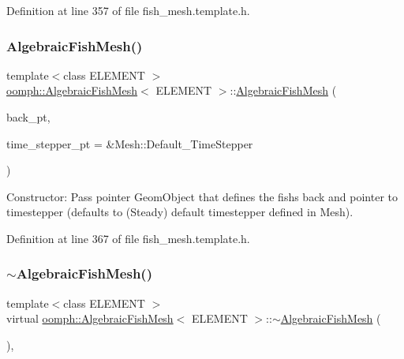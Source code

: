 Definition at line 357 of file fish\+\_\+mesh.\+template.\+h.

\mbox{\label{classoomph_1_1AlgebraicFishMesh_aac4b7f18a6e1d10c64edf431af921ce7}} 
\subsubsection{\texorpdfstring{Algebraic\+Fish\+Mesh()}{AlgebraicFishMesh()}\hspace{0.1cm}{\footnotesize\ttfamily [2/2]}}
{\footnotesize\ttfamily template$<$class E\+L\+E\+M\+E\+NT $>$ \\
\hyperlink{classoomph_1_1AlgebraicFishMesh}{oomph\+::\+Algebraic\+Fish\+Mesh}$<$ E\+L\+E\+M\+E\+NT $>$\+::\hyperlink{classoomph_1_1AlgebraicFishMesh}{Algebraic\+Fish\+Mesh} (\begin{DoxyParamCaption}\item[{Geom\+Object $\ast$}]{back\+\_\+pt,  }\item[{Time\+Stepper $\ast$}]{time\+\_\+stepper\+\_\+pt = {\ttfamily \&Mesh\+:\+:Default\+\_\+TimeStepper} }\end{DoxyParamCaption})\hspace{0.3cm}{\ttfamily [inline]}}



Constructor\+: Pass pointer Geom\+Object that defines the fish\textquotesingle{}s back and pointer to timestepper (defaults to (Steady) default timestepper defined in Mesh). 



Definition at line 367 of file fish\+\_\+mesh.\+template.\+h.

\mbox{\label{classoomph_1_1AlgebraicFishMesh_a027d54d158e22ce8fe3c1246cb030440}} 
\subsubsection{\texorpdfstring{$\sim$\+Algebraic\+Fish\+Mesh()}{~AlgebraicFishMesh()}}
{\footnotesize\ttfamily template$<$class E\+L\+E\+M\+E\+NT $>$ \\
virtual \hyperlink{classoomph_1_1AlgebraicFishMesh}{oomph\+::\+Algebraic\+Fish\+Mesh}$<$ E\+L\+E\+M\+E\+NT $>$\+::$\sim$\hyperlink{classoomph_1_1AlgebraicFishMesh}{Algebraic\+Fish\+Mesh} (\begin{DoxyParamCaption}{ }\end{DoxyParamCaption})\hspace{0.3cm}{\ttfamily [inline]}, {\ttfamily [virtual]}}



